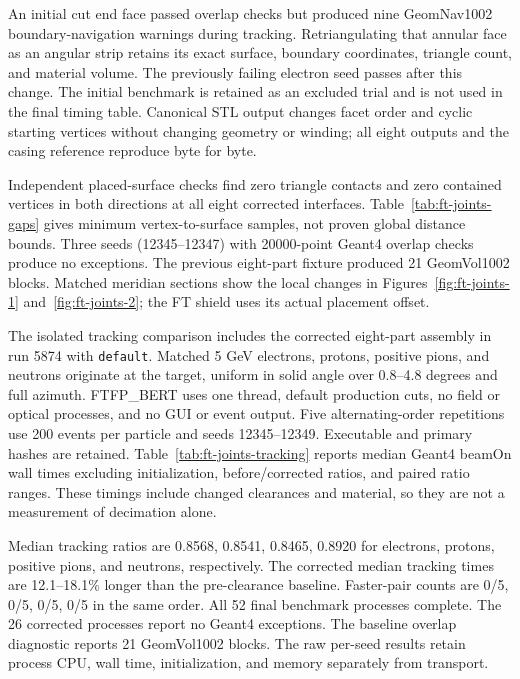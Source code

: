 An initial cut end face passed overlap checks but produced nine GeomNav1002 boundary-navigation warnings
during tracking. Retriangulating that annular face as an angular strip retains its exact surface, boundary
coordinates, triangle count, and material volume. The previously failing electron seed passes after this
change. The initial benchmark is retained as an excluded trial and is not used in the final timing table.
Canonical STL output changes facet order and cyclic starting vertices without changing geometry or winding;
all eight outputs and the casing reference reproduce byte for byte.

Independent placed-surface checks find zero triangle contacts and zero contained vertices in both directions
at all eight corrected interfaces. Table~\ref{tab:ft-joints-gaps} gives minimum vertex-to-surface samples, not
proven global distance bounds. Three seeds (12345--12347) with 20000-point Geant4 overlap checks produce no
exceptions. The previous eight-part fixture produced 21 GeomVol1002 blocks. Matched meridian sections show the
local changes in Figures~\ref{fig:ft-joints-1} and~\ref{fig:ft-joints-2}; the FT shield uses its actual
placement offset.

The isolated tracking comparison includes the corrected eight-part assembly in run 5874 with \texttt{default}.
Matched 5 GeV electrons, protons, positive pions, and neutrons originate at the target, uniform in solid angle
over 0.8--4.8 degrees and full azimuth. FTFP\_BERT uses one thread, default production cuts, no field or
optical processes, and no GUI or event output. Five alternating-order repetitions use 200 events per particle
and seeds 12345--12349. Executable and primary hashes are retained. Table~\ref{tab:ft-joints-tracking} reports
median Geant4 beamOn wall times excluding initialization, before/corrected ratios, and paired ratio ranges.
These timings include changed clearances and material, so they are not a measurement of decimation alone.

Median tracking ratios are 0.8568, 0.8541, 0.8465, 0.8920 for electrons, protons, positive pions, and
neutrons, respectively. The corrected median tracking times are 12.1--18.1\% longer than the pre-clearance
baseline. Faster-pair counts are 0/5, 0/5, 0/5, 0/5 in the same order. All 52 final benchmark processes
complete. The 26 corrected processes report no Geant4 exceptions. The baseline overlap diagnostic reports 21
GeomVol1002 blocks. The raw per-seed results retain process CPU, wall time, initialization, and memory
separately from transport.

